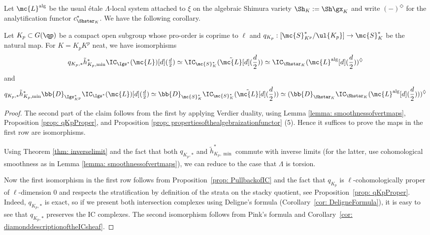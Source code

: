 \documentclass[letterpaper,11pt]{amsart}
\begin{document}
Let $\mc{L}^\mathrm{alg}$ be the usual \'etale $\Lambda$-local system attached to $\xi$ on the algebraic Shimura variety $\Sh_K:=\Sh\gx_K$ and write $(-)^\Diamond$ for the analytification functor $c_{\Shstar_K}^\ast$. We have the following corollary.
\begin{corollary}\label{cor: CompareIC}
    Let $K_p \subset G(\qp)$ be a compact open subgroup whose pro-order is coprime to $\ell$ and $q_{K_p}: [\mc{S}^\ast_{K^p}/\ul{K_p}]\to \mc{S}_K^\ast$ be the natural map. For $K =K_pK^p$ neat, we have isomorphisms
    \[ q_{K_p,\ast}\tilde{h}_{K_p,\min}^{\ast}\IC_{\Igs^\ast}(\mc{L})[d](\tfrac{d}{2}) \simeq \IC_{\mc{S}^\ast_K}(\tilde{\mc{L}}[d](\frac{d}{2}))\simeq \IC_{\Shstar_K}(\mc{L}^\mathrm{alg}[d](\frac{d}{2}))^\Diamond\]
    and 
    \[ q_{K_p,\ast}\tilde{h}_{K_p,\min}^{\ast}\bb{D}_{\Igs_{K^{p}}^{*}}\IC_{\Igs^\ast}(\mc{L})[d](\tfrac{d}{2}) \simeq \bb{D}_{\mc{S}^\ast_K}\IC_{\mc{S}^\ast_K}(\tilde{\mc{L}}[d](\frac{d}{2}))\simeq (\bb{D}_{\Shstar_{K}}\IC_{\Shstar_K}(\mc{L}^\mathrm{alg}[d](\frac{d}{2})))^\Diamond\]
\end{corollary}
\begin{proof}
The second part of the claim follows from the first by applying Verdier duality, using Lemma \ref{lemma: smoothnessofvertmaps}, Proposition \ref{prop: qKpProper}, and Proposition \ref{prop: propertiesofthealgebraizationfunctor} (5). Hence it suffices to prove the maps in the first row are isomorphisms.

Using Theorem \ref{thm: inverselimit} and the fact that both $q_{K_p,\ast}$ and $\tilde{h}^\ast_{K_p,\min}$ commute with inverse limits (for the latter, use cohomological smoothness as in Lemma \ref{lemma: smoothnessofvertmaps}), we can reduce to the case that $\Lambda$ is torsion. 

Now the first isomorphism in the first row follows from Proposition~\ref{prop: PullbackofIC} and the fact that $q_{K_p}$ is $\ell$-cohomologically proper of $\ell$-dimension $0$ and respects the stratification by definition of the strata on the stacky quotient, see Proposition~\ref{prop: qKpProper}. Indeed, $q_{K_p,\ast}$ is exact, so if we present both intersection complexes using Deligne's formula (Corollary~\ref{cor: DeligneFormula}), it is easy to see that $q_{K_p,\ast}$ preserves the IC complexes. The second isomorphism follows from Pink's formula \cite[Theorem 4.2.1]{PinkHigherDirectImages} and Corollary~\ref{cor: diamonddescriptionoftheICsheaf}.


\end{proof}
\end{document}

